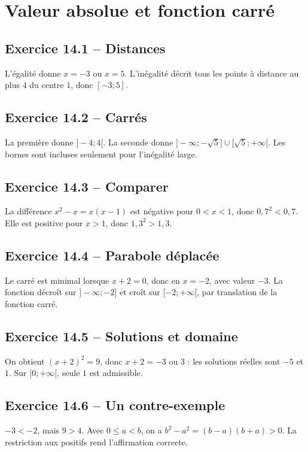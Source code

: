 \chapter{Valeur absolue et fonction carré}
\section*{Exercice 14.1 -- Distances}
L'égalité donne $x=-3$ ou $x=5$. L'inégalité décrit tous les points à distance au plus $4$ du centre $1$, donc $[-3;5]$.

\section*{Exercice 14.2 -- Carrés}
La première donne $]-4;4[$. La seconde donne $]-\infty;-\sqrt5]\cup[\sqrt5;+\infty[$. Les bornes sont incluses seulement pour l'inégalité large.

\section*{Exercice 14.3 -- Comparer}
La différence $x^2-x=x(x-1)$ est négative pour $0<x<1$, donc $0{,}7^2<0{,}7$. Elle est positive pour $x>1$, donc $1{,}3^2>1{,}3$.

\section*{Exercice 14.4 -- Parabole déplacée}
Le carré est minimal lorsque $x+2=0$, donc en $x=-2$, avec valeur $-3$. La fonction décroît sur $]-\infty;-2]$ et croît sur $[-2;+\infty[$, par translation de la fonction carré.

\section*{Exercice 14.5 -- Solutions et domaine}
On obtient $(x+2)^2=9$, donc $x+2=-3$ ou $3$ : les solutions réelles sont $-5$ et $1$. Sur $[0;+\infty[$, seule $1$ est admissible.

\section*{Exercice 14.6 -- Un contre-exemple}
$-3<-2$, mais $9>4$. Avec $0\leq a<b$, on a $b^2-a^2=(b-a)(b+a)>0$. La restriction aux positifs rend l'affirmation correcte.
